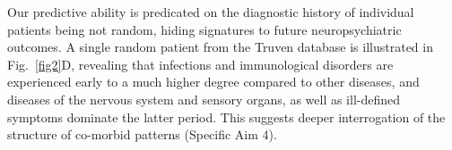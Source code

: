 \documentclass[onecolumn, compsoc,11pt]{IEEEtran}
\makeatletter
\renewcommand\subsection{\@startsection {subsection}{2}{\z@}%
                                   {0ex \@plus -1.75ex \@minus -1.2ex}%
                                   {0ex \@plus.0ex}%
                                   {\fontsize{11}{11}\selectfont\bfseries\sffamily\color{black}}}
\renewcommand{\captionN}[1]{\caption{\color{CadetBlue4!80!black} \sffamily \fontsize{9}{10}\selectfont #1  }}
\makeatother
\begin{document}
Our predictive ability is predicated on the diagnostic history of individual patients being not random, hiding signatures to future neuropsychiatric outcomes. A single random patient from the Truven database is illustrated in Fig.~\ref{fig2}D, revealing that infections and immunological disorders are experienced early to a much higher degree compared to other diseases, and diseases of the nervous system and sensory organs, as well as ill-defined symptoms dominate the latter period. This suggests deeper interrogation of the structure of co-morbid patterns (Specific Aim 4).
%
%
%
\end{document}
